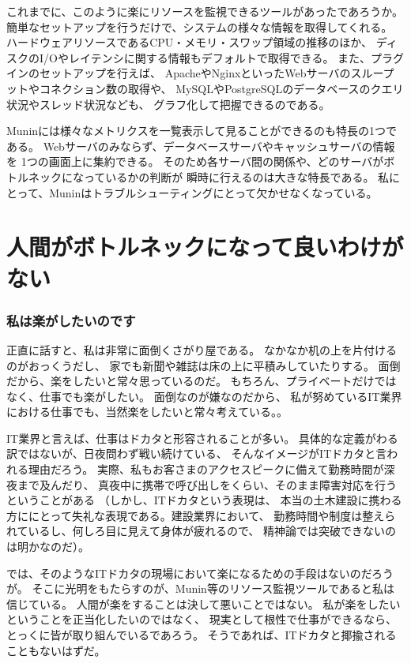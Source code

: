 これまでに、このように楽にリソースを監視できるツールがあったであろうか。
簡単なセットアップを行うだけで、システムの様々な情報を取得してくれる。
ハードウェアリソースであるCPU・メモリ・スワップ領域の推移のほか、
ディスクのI/Oやレイテンシに関する情報もデフォルトで取得できる。
また、プラグインのセットアップを行えば、
ApacheやNginxといったWebサーバのスループットやコネクション数の取得や、
MySQLやPostgreSQLのデータベースのクエリ状況やスレッド状況なども、
グラフ化して把握できるのである。

Muninには様々なメトリクスを一覧表示して見ることができるのも特長の1つである。
Webサーバのみならず、データベースサーバやキャッシュサーバの情報を
1つの画面上に集約できる。
そのため各サーバ間の関係や、どのサーバがボトルネックになっているかの判断が
瞬時に行えるのは大きな特長である。
私にとって、Muninはトラブルシューティングにとって欠かせなくなっている。

\section{人間がボトルネックになって良いわけがない}
\subsubsection{私は楽がしたいのです}
正直に話すと、私は非常に面倒くさがり屋である。
なかなか机の上を片付けるのがおっくうだし、
家でも新聞や雑誌は床の上に平積みしていたりする。
面倒だから、楽をしたいと常々思っているのだ。
もちろん、プライベートだけではなく、仕事でも楽がしたい。
面倒なのが嫌なのだから、
私が努めているIT業界における仕事でも、当然楽をしたいと常々考えている。。

IT業界と言えば、仕事はドカタと形容されることが多い。
具体的な定義がわる訳ではないが、日夜問わず戦い続けている、
そんなイメージがITドカタと言われる理由だろう。
実際、私もお客さまのアクセスピークに備えて勤務時間が深夜まで及んだり、
真夜中に携帯で呼び出しをくらい、そのまま障害対応を行うということがある
（しかし、ITドカタという表現は、
本当の土木建設に携わる方ににとって失礼な表現である。建設業界において、
勤務時間や制度は整えられているし、何しろ目に見えて身体が疲れるので、
精神論では突破できないのは明かなのだ）。

では、そのようなITドカタの現場において楽になるための手段はないのだろうが。
そこに光明をもたらすのが、Munin等のリソース監視ツールであると私は信じている。
人間が楽をすることは決して悪いことではない。
私が楽をしたいということを正当化したいのではなく、
現実として根性で仕事ができるなら、とっくに皆が取り組んでいるであろう。
そうであれば、ITドカタと揶揄されることもないはずだ。

